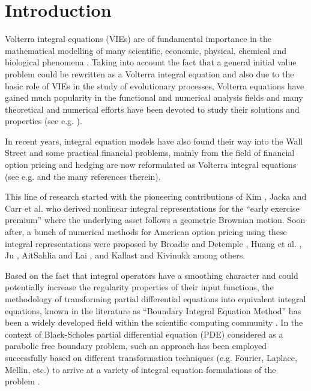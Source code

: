 \documentclass[fleqn,final,3p,11pt]{elsarticle}
\theoremstyle{definition}
\theoremstyle{remark}
\numberwithin{equation}{section}
\begin{document}
\section{Introduction}\label{s1}\setcounter{equation}{0}
Volterra integral equations (VIEs) are of fundamental importance in the mathematical modelling of many scientific, economic, physical, chemical and biological phenomena \cite{corduneanu1991integral, jerri1999introduction}. Taking into account the fact that a general initial value problem could be rewritten as a Volterra integral equation and also due to the basic role of VIEs in the study of evolutionary processes, Volterra equations have gained much popularity in the functional and numerical analysis fields and many theoretical and numerical efforts have been devoted to study their solutions and properties (see e.g. \cite{brunner, hack}).

In recent years, integral equation models have also found their way into the Wall Street and some practical financial problems, mainly from the field of financial option pricing and hedging are now reformulated as Volterra integral equations (see e.g. \cite{chen, evans,  patrik2, keller, shev2} and the many references therein).

This line of research started with the pioneering contributions of Kim \cite{kim}, Jacka \cite{jacka} and Carr et al. \cite{carr1} who derived nonlinear integral representations for the ``early exercise premium'' where the underlying asset follows a geometric Brownian motion. Soon after, a bunch of numerical methods for American option pricing using these integral representations were proposed by Broadie and Detemple \cite{broadie1996american}, Huang et al. \cite{huang1996pricing}, Ju \cite{ju}, AitSahlia and Lai \cite{lai2}, and Kallast and Kivinukk \cite{kallast} among others.

Based on the fact that integral operators have a smoothing character and could potentially increase the regularity properties of their input functions, the methodology of transforming partial differential equations into equivalent integral equations, known in the literature as ``Boundary Integral Equation Method'' has been a widely developed field within the scientific computing community \cite{stas}. In the context of Black-Scholes partial differential equation (PDE) considered as a parabolic free boundary problem, such an approach has been employed successfully based on different transformation techniques (e.g. Fourier, Laplace, Mellin, etc.) to arrive at a variety of integral equation formulations of the problem \cite{MR2087015}.
\end{document}
